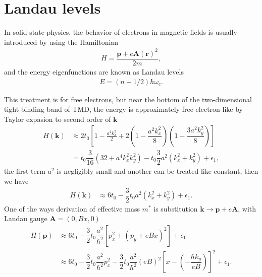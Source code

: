\documentclass{report}
\newcommand{\f}[2]{\dfrac{#1}{#2}}
\begin{document}
\section{Landau levels}
In solid-state physics, the behavior of electrons in magnetic fields is usually introduced by using the Hamiltonian
\begin{gather}
	H = \f{\mathbf{p} + e \mathbf{A}(\mathbf{r})^{2}}{2m} ,
\end{gather}
and the energy eigenfunctions are known as Landau levels
\begin{gather}
	E = \left(n + 1/2\right) \hbar \omega_{c}.
\end{gather}

This treatment is for free electrons, \cite{10.1119/1.1615568} but near the bottom of the two-dimensional tight-binding band of TMD, the energy is approximately free-electron-like by Taylor expasion to second order of $\mathbf{k}$
\begin{equation}
	\begin{aligned}
		H(\mathbf{k})
		 & \approx 2 t_{0} \left[1 - \frac{a^{2} k_{x}^{2}}{2} + 2\left(1 - \f{a^{2} k_{x}^{2}}{8}\right)\left(1 - \f{3a^{2} k_{y}^{2}}{8}\right)\right] \\
		 & = t_{0} \f{3}{16} \left(32 + a^{4} k_{x}^{2} k_{y}^{2}\right) - t_{0} \f{3}{2} a^{2}\left(k_{x}^{2} + k_{y}^{2}\right) + \epsilon_{1} ,
	\end{aligned}
\end{equation}
the first term $a^{2}$ is negligibly small and another can be treated like constant, then we have
\begin{equation}
	\begin{aligned}
		H(\mathbf{k})
		 & \approx 6 t_{0} - \f{3}{2} t_{0} a^{2} (k_{x}^{2} + k_{y}^{2}) + \epsilon_{1}.
	\end{aligned}
\end{equation}
One of the ways derivation of effective mass $m^{*}$ is substitution $\mathbf{k} \rightarrow \mathbf{p} + e \mathbf{A}$, with Landau gauge $\mathbf{A} = (0,Bx,0)$
\begin{equation}
	\begin{aligned}
		H(\mathbf{p})
		 & \approx 6 t_{0} - \f{3}{2} t_{0} \f{a^{2}}{\hbar^{2}} \left[ p_{x}^{2} + \left(p_{y} + e B x\right)^{2}\right] + \epsilon_{1}                                                             \\
		 & \approx 6 t_{0} - \f{3}{2} t_{0} \f{a^{2}}{\hbar^{2}} p_{x}^{2} - \f{3}{2} t_{0} \f{a^{2}}{\hbar^{2}} (e B)^{2} \left[ x - \left(- \f{\hbar k_{y}}{eB}\right) \right]^{2} + \epsilon_{1}.
	\end{aligned}
\end{equation}
\end{document}
